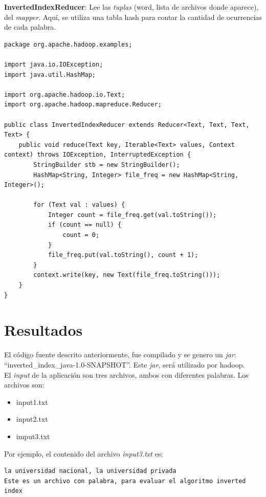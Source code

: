 \documentclass{article}
\begin{document}
\textbf{InvertedIndexReducer}: Lee las \textit{tuplas} (word, lista de archivos donde aparece), del \textit{mapper}. Aquí, se utiliza una tabla hash para contar la cantidad de ocurrencias de cada palabra.\\
\begin{lstlisting}
package org.apache.hadoop.examples;

import java.io.IOException;
import java.util.HashMap;

import org.apache.hadoop.io.Text;
import org.apache.hadoop.mapreduce.Reducer;

public class InvertedIndexReducer extends Reducer<Text, Text, Text, Text> {
	public void reduce(Text key, Iterable<Text> values, Context context) throws IOException, InterruptedException {
		StringBuilder stb = new StringBuilder();
		HashMap<String, Integer> file_freq = new HashMap<String, Integer>();

		for (Text val : values) {
			Integer count = file_freq.get(val.toString());
			if (count == null) {
				count = 0;
			}
			file_freq.put(val.toString(), count + 1);
		}
		context.write(key, new Text(file_freq.toString()));
	}
}

\end{lstlisting}




\section{Resultados}
El código fuente descrito anteriormente, fue compilado y se genero un \textit{jar}: ``inverted\_index\_java-1.0-SNAPSHOT''. Este \textit{jar}, será utilizado por hadoop.\\

El \textit{input} de la aplicación son tres archivos, ambos con diferentes palabras. Los archivos son:

\begin{itemize}
    \item input1.txt
    \item input2.txt
    \item imput3.txt
\end{itemize}

Por ejemplo, el contenido del archivo \textit{input3.txt} es:
\begin{lstlisting}
la universidad nacional, la universidad privada
Este es un archivo con palabra, para evaluar el algoritmo inverted index
\end{lstlisting}
\end{document}
